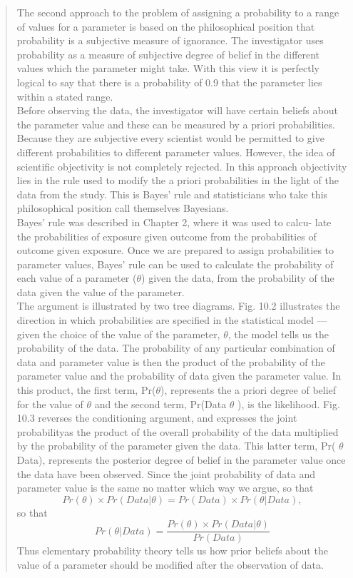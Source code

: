 \documentclass[]{book}
\begin{document}
\begin{quote}
The second approach to the problem of assigning a probability to a range of
values for a parameter is based on the philosophical position that probability is a subjective measure of ignorance. The investigator uses probability
as a measure of subjective degree of belief in the different values which the
parameter might take. With this view it is perfectly logical to say that
there is a probability of 0.9 that the parameter lies within a stated range.\\
Before observing the data, the investigator will have certain beliefs
about the parameter value and these can be measured by a priori probabilities. Because they are subjective every scientist would be permitted
to give different probabilities to different parameter values. However, the
idea of scientific objectivity is not completely rejected. In this approach
objectivity lies in the rule used to modify the a priori probabilities in the
light of the data from the study. This is Bayes' rule and statisticians who
take this philosophical position call themselves Bayesians.\\
Bayes' rule was described in Chapter 2, where it was used to calcu-
late the probabilities of exposure given outcome from the probabilities of
outcome given exposure. Once we are prepared to assign probabilities to
parameter values, Bayes' rule can be used to calculate the probability of
each value of a parameter (\(\theta\)) given the data, from the probability of the data given the value of the parameter.\\
The argument is illustrated by two tree diagrams. Fig. 10.2 illustrates
the direction in which probabilities are specified in the statistical model
--- given the choice of the value of the parameter, \(\theta\), the model tells us
the probability of the data. The probability of any particular combination
of data and parameter value is then the product of the probability of the
parameter value and the probability of data given the parameter value. In
this product, the first term, Pr(\(\theta\)), represents the a priori degree of belief for the value of \(\theta\) and the second term, Pr(Data \textbar{} \(\theta\) ), is the likelihood. Fig. 10.3 reverses the conditioning argument, and expresses the joint probabilityas the product of the overall probability of the data multiplied by the probability of the parameter given the data. This latter term, Pr( \(\theta\) \textbar{} Data), represents the posterior degree of belief in the parameter value once the data have been observed. Since the joint probability of data and parameter value is the same no matter which way we argue,
so that
\[Pr(\theta) \times Pr(Data | \theta) = Pr(Data) \times Pr(\theta | Data),\]
so that
\[Pr(\theta | Data) = \frac{Pr(\theta) \times Pr(Data | \theta)}{Pr(Data)}\]
Thus elementary probability theory tells us how prior beliefs about the
value of a parameter should be modified after the observation of data.
\end{quote}
\end{document}
